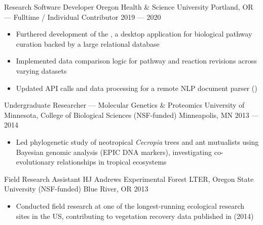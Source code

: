 \vspace*{\baselineskip}

\showoff
{Research Software Developer}
{Oregon Health \& Science University}
{Portland, OR --- Fulltime / Individual Contributor}
{2019 --- 2020}

\begin{itemize}
    \item Furthered development of the , a desktop application for biological pathway curation backed by a large relational database
    \item Implemented data comparison logic for pathway and reaction revisions across varying datasets
    \item Updated API calls and data processing for a remote NLP document parser ()
\end{itemize}


\showoff
{Undergraduate Researcher --- Molecular Genetics \& Proteomics}
{University of Minnesota, College of Biological Sciences (NSF-funded)}
{Minneapolis, MN}
{2013 --- 2014}

\begin{itemize}
    \item Led phylogenetic study of neotropical \emph{Cecropia} trees and ant mutualists using Bayesian genomic analysis (EPIC DNA markers), investigating co-evolutionary relationships in tropical ecosystems
\end{itemize}

\vspace{1em}

\showoff
{Field Research Assistant}
{HJ Andrews Experimental Forest LTER, Oregon State University (NSF-funded)}
{Blue River, OR}
{2013}

\begin{itemize}
    \item Conducted field research at one of the longest-running ecological research sites in the US, contributing to vegetation recovery data published in  (2014)
\end{itemize}





\vfill \myBreak{}


